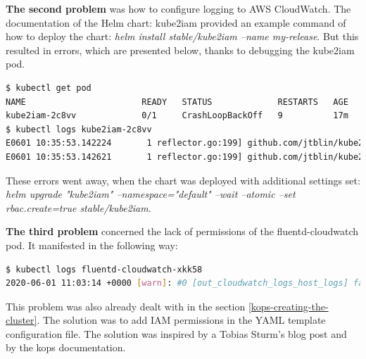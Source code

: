 \textbf{The second problem} was how to configure logging to AWS CloudWatch. The documentation of the Helm chart: kube2iam \cite{kube2iam} provided an example command of how to deploy the chart: \textit{helm install stable/kube2iam --name my-release}. But this resulted in errors, which are presented below, thanks to debugging the kube2iam pod.
\begin{lstlisting}[basicstyle=\tiny,caption={Debugging kube2iam pod},captionpos=b,language=Bash,xleftmargin=1cm]
$ kubectl get pod
NAME                       READY   STATUS             RESTARTS   AGE
kube2iam-2c8vv             0/1     CrashLoopBackOff   9          17m
$ kubectl logs kube2iam-2c8vv
E0601 10:35:53.142224       1 reflector.go:199] github.com/jtblin/kube2iam/vendor/k8s.io/client-go/tools/cache/reflector.go:94: Failed to list *v1.Pod: pods is forbidden: User "system:serviceaccount:default:default" cannot list resource "pods" in API group "" at the cluster scope
E0601 10:35:53.142621       1 reflector.go:199] github.com/jtblin/kube2iam/vendor/k8s.io/client-go/tools/cache/reflector.go:94: Failed to list *v1.Namespace: namespaces is forbidden: User "system:serviceaccount:default:default" cannot list resource "namespaces" in API group "" at the cluster scope
\end{lstlisting}

These errors went away, when the chart was deployed with additional settings set: \textit{helm upgrade "kube2iam" --namespace="default" --wait --atomic --set rbac.create=true stable/kube2iam}.

\textbf{The third problem} concerned the lack of permissions of the fluentd-cloudwatch pod. It manifested in the following way:
\begin{lstlisting}[basicstyle=\tiny,caption={Debugging the fluent-cloudwatch pod},captionpos=b,language=Bash,xleftmargin=1cm]
$ kubectl logs fluentd-cloudwatch-xkk58
2020-06-01 11:03:14 +0000 [warn]: #0 [out_cloudwatch_logs_host_logs] failed to flush the buffer. retry_time=8 next_retry_seconds=2020-06-01 11:05:22 +0000 chunk="5a703b5e45c9592f24399f9b73acaf43" error_class=Aws::CloudWatchLogs::Errors::AccessDeniedException error="User: arn:aws:sts::976184668068:assumed-role/nodes.testing.k8s-kops-for-masters-thesis.k8s.local/i-04a926040234f36d6 is not authorized to perform: logs:DescribeLogGroups on resource: arn:aws:logs:eu-west-1:976184668068:log-group::log-stream:"
\end{lstlisting}
This problem was also already dealt with in the section \ref{kops-creating-the-cluster}. The solution was to add IAM permissions in the YAML template configuration file. The solution was inspired by a Tobias Sturm's blog post \cite{kops-logs-cw-tobias} and by the kops documentation\cite{online-kops-iam}.

